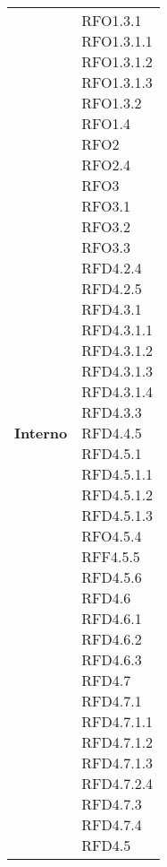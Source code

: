 \begin{longtable}[H]{| >{\centering\bfseries}p{8cm} | >{\centering\arraybackslash}p{8cm} |}
    Interno &
        \makecell{
            RFO1.3.1 \\
            RFO1.3.1.1 \\
            RFO1.3.1.2 \\
            RFO1.3.1.3 \\
            RFO1.3.2 \\
            RFO1.4 \\
            RFO2 \\
            RFO2.4 \\
            RFO3 \\
            RFO3.1 \\
            RFO3.2 \\
            RFO3.3 \\
            RFD4.2.4 \\
            RFD4.2.5 \\
            RFD4.3.1 \\
            RFD4.3.1.1 \\
            RFD4.3.1.2 \\
            RFD4.3.1.3 \\
            RFD4.3.1.4 \\
            RFD4.3.3 \\
            RFD4.4.5 \\
            RFD4.5.1 \\
            RFD4.5.1.1 \\
            RFD4.5.1.2 \\
            RFD4.5.1.3 \\
            RFO4.5.4 \\
            RFF4.5.5 \\
            RFD4.5.6 \\
            RFD4.6 \\
            RFD4.6.1 \\
            RFD4.6.2 \\
            RFD4.6.3 \\
            RFD4.7 \\
            RFD4.7.1 \\
            RFD4.7.1.1\\
            RFD4.7.1.2 \\
            RFD4.7.1.3 \\
            RFD4.7.2.4 \\
            RFD4.7.3 \\
            RFD4.7.4 \\
            RFD4.5 \\
}
\end{longtable}
